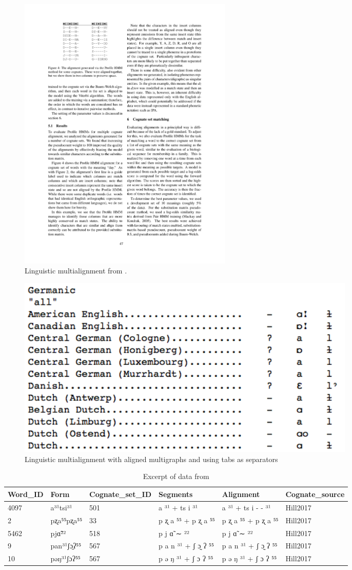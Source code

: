 \documentclass[11pt]{article}
\begin{document}
\begin{figure}[htbp]
  \centering
  \includegraphics[width=0.5\textwidth]{images/multialign_bhargava.pdf}
  \caption{Linguistic multialignment from \textcite[47]{bhargava2009}.}
  \label{fig:multialign_bhargava}
\end{figure}

\begin{figure}[htbp]
  \centering
  \includegraphics[width=0.8\textwidth]{images/multialign_list.png}
  \caption{Linguistic multialignment with aligned multigraphs and using tabs as separators \parencite{list2014benchmark}}
  \label{fig:multialign_list}
\end{figure}

\begin{table}[htp]
\begin{center}
\begin{tabular}{llllll} \hline
 Word\_ID & Form & Cognate\_set\_ID & Segments & Alignment & Cognate\_source \\ \hline
 4097 & a³¹tsi³¹ & 501 & a ³¹ + ts i ³¹ & a ³¹ + ts i - - ³¹ & Hill2017 \\
 2 & pʐa⁵⁵pʐa⁵⁵ & 33 & p ʐ a ⁵⁵ + p ʐ a ⁵⁵ & p ʐ a ⁵⁵ + p ʐ a ⁵⁵ & Hill2017 \\ 
 5462 & pjɑ̃²² & 518 & p j ɑ̃ ∼ ²² & p j ɑ̃ ∼ ²² & Hill2017 \\ 
 9 & pan³¹ʃɔ̱ʔ⁵⁵ & 567 & p a n ³¹ + ʃ ɔ̰ ʔ ⁵⁵ & p a n ³¹ + ʃ ɔ̰ ʔ ⁵⁵ & Hill2017 \\ 
 10 & pəŋ³¹ʃɔʔ⁵⁵ & 567 & p ə ŋ ³¹ + ʃ ɔ ʔ ⁵⁵ & p ə ŋ ³¹ + ʃ ɔ ʔ ⁵⁵ & Hill2017 \\ \hline
\end{tabular}
\end{center}
\caption{Excerpt of data from \cite{hill2017}}
\label{tab:data_hill}
\end{table}
\end{document}
